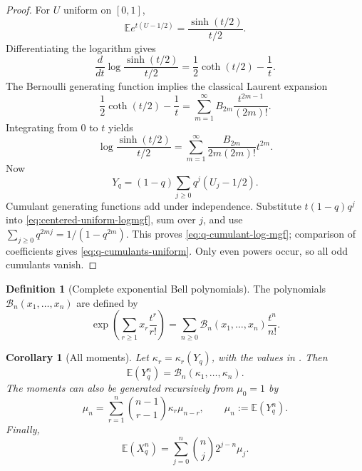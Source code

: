 \documentclass[11pt,oneside,openany]{book}
\newtheorem{corollary}[corollary]{Corollary}
\theoremstyle{definition}
\newtheorem{definition}[definition]{Definition}
\theoremstyle{remark}
\begin{document}
\begin{proof}
For $U$ uniform on $[0,1]$,
\[
 \mathbb Ee^{t(U-1/2)}
 =\frac{\sinh(t/2)}{t/2}.
\]
Differentiating the logarithm gives
\[
 \frac{d}{dt}\log\frac{\sinh(t/2)}{t/2}
 =\frac12\coth(t/2)-\frac1t.
\]
The Bernoulli generating function implies the classical Laurent expansion
\[
 \frac12\coth(t/2)-\frac1t
 =\sum_{m=1}^{\infty}B_{2m}\frac{t^{2m-1}}{(2m)!}.
\]
Integrating from $0$ to $t$ yields
\begin{equation}\label{eq:centered-uniform-logmgf}
 \log\frac{\sinh(t/2)}{t/2}
 =\sum_{m=1}^{\infty}
   \frac{B_{2m}}{2m(2m)!}t^{2m}.
\end{equation}
Now
\[
 Y_q=(1-q)\sum_{j\ge0}q^j(U_j-1/2).
\]
Cumulant generating functions add under independence.  Substitute
$t(1-q)q^j$ into \eqref{eq:centered-uniform-logmgf}, sum over $j$, and use
$\sum_{j\ge0}q^{2mj}=1/(1-q^{2m})$.  This proves
\eqref{eq:q-cumulant-log-mgf}; comparison of coefficients gives
\eqref{eq:q-cumulants-uniform}.  Only even powers occur, so all odd cumulants vanish.
\end{proof}

\begin{definition}[Complete exponential Bell polynomials]
The polynomials $\mathcal B_n(x_1,\ldots,x_n)$ are defined by
\begin{equation}\label{eq:complete-bell-definition}
 \exp\!\left(\sum_{r\ge1}x_r\frac{t^r}{r!}\right)
 =\sum_{n\ge0}\mathcal B_n(x_1,\ldots,x_n)\frac{t^n}{n!}.
\end{equation}
\end{definition}

\begin{corollary}[All moments]\label{cor:geometric-uniform-moments}
Let $\kappa_r=\kappa_r(Y_q)$, with the values in
.  Then
\begin{equation}\label{eq:centered-moments-bell}
 \mathbb E(Y_q^n)=\mathcal B_n(\kappa_1,\ldots,\kappa_n).
\end{equation}
The moments can also be generated recursively from $\mu_0=1$ by
\begin{equation}\label{eq:moment-cumulant-recurrence}
 \mu_n=\sum_{r=1}^{n}\binom{n-1}{r-1}\kappa_r\mu_{n-r},
 \qquad \mu_n:=\mathbb E(Y_q^n).
\end{equation}
Finally,
\begin{equation}\label{eq:raw-moments-from-centered}
 \mathbb E(X_q^n)=\sum_{j=0}^{n}\binom nj2^{j-n}\mu_j.
\end{equation}
\end{corollary}
\end{document}
